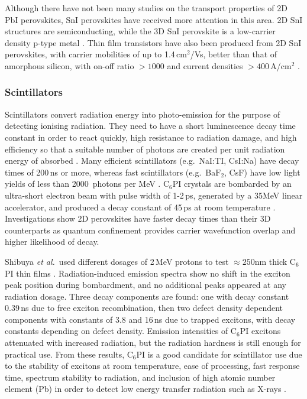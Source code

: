 Although there have not been many studies on the transport properties of 2D PbI perovskites, SnI perovskites have received more attention in this area. 2D SnI structures are semiconducting, while the 3D SnI perovskite is a low-carrier density p-type metal \cite{Mitzi1994}. Thin film transistors have also been produced from 2D SnI perovskites, with carrier mobilities of up to 1.4\,cm$^2$/Vs, better than that of amorphous silicon, with on-off ratio $>1000$ and current densities $>400$\,A/cm$^2$ \cite{Mitzi2002b, Mitzi2001d, Kagan1999a}.

\subsubsection{Scintillators}
Scintillators convert radiation energy into photo-emission for the purpose of detecting ionising radiation. They need to have a short luminescence decay time constant in order to react quickly, high resistance to radiation damage, and high efficiency so that a suitable number of photons are created per unit radiation energy of absorbed \cite{Shibuya2002}. Many efficient scintillators (e.g.\ NaI:TI, CsI:Na) have decay times of 200\,ns or more, whereas fast scintillators (e.g.\ Ba$\textrm{F}_2$, CsF) have low light yields of less than 2000~photons per MeV \cite{Kengo2002}. $\textrm{C}_6$PI crystals are bombarded by an ultra-short electron beam with pulse width of 1-2\,ps, generated by a 35MeV linear accelerator, and produced a decay constant of 45\,ps at room temperature \cite{Kengo2002}. Investigations show 2D perovskites have faster decay times than their 3D counterparts as quantum confinement provides carrier wavefunction overlap and higher likelihood of decay.

Shibuya \textit{et al.}\ used different dosages of 2\,MeV protons to test $\approx250$nm thick $\textrm{C}_6$PI thin films \cite{Shibuya2002}. Radiation-induced emission spectra show no shift in the exciton peak position during bombardment, and no additional peaks appeared at any radiation dosage. Three decay components are found: one with decay constant 0.39\,ns due to free exciton recombination, then two defect density dependent components with constants of 3.8 and 16\,ns due to trapped excitons, with decay constants depending on defect density. Emission intensities of $\textrm{C}_6$PI excitons attenuated with increased radiation, but the radiation hardness is still enough for practical use. From these results, $\textrm{C}_6$PI is a good candidate for scintillator use due to the stability of excitons at room temperature, ease of processing, fast response time, spectrum stability to radiation, and inclusion of high atomic number element (Pb) in order to detect low energy transfer radiation such as X-rays \cite{Shibuya2004}. 

